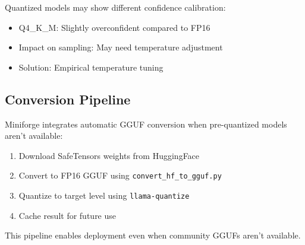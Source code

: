 Quantized models may show different confidence calibration:

\begin{itemize}
    \item Q4\_K\_M: Slightly overconfident compared to FP16
    \item Impact on sampling: May need temperature adjustment
    \item Solution: Empirical temperature tuning
\end{itemize}

\subsection{Conversion Pipeline}

Miniforge integrates automatic GGUF conversion when pre-quantized models aren't available:

\begin{enumerate}
    \item Download SafeTensors weights from HuggingFace
    \item Convert to FP16 GGUF using \texttt{convert\_hf\_to\_gguf.py}
    \item Quantize to target level using \texttt{llama-quantize}
    \item Cache result for future use
\end{enumerate}

This pipeline enables deployment even when community GGUFs aren't available.
